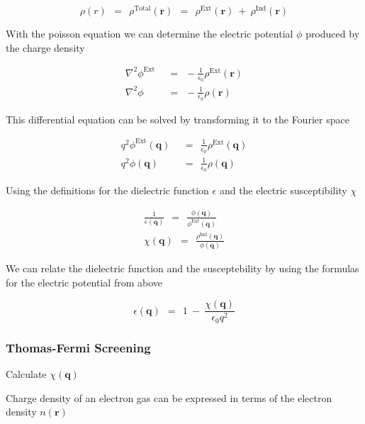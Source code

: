 \documentclass[10pt]{report}
\numberwithin{equation}{chapter}
\begin{document}
\begin{equation} \label{eq:tot_charge_dens}
  \rho(r) ~~=~~ \rho^\text{Total}(\mathbf{r}) ~~=~~ \rho^\text{Ext}(\mathbf{r}) ~+~ \rho^\text{Ind}(\mathbf{r})
\end{equation}


With the poisson equation we can determine the electric potential $\phi$ produced by the charge density

\begin{align}
  \nabla^2 \phi^\text{Ext} ~~& =~~ -\frac{1}{\epsilon_0} \rho^\text{Ext}(\mathbf{r}) \\
  \nabla^2 \phi	~~& =~~ -\frac{1}{\epsilon_0} \rho(\mathbf{r})
\end{align}


This differential equation can be solved by transforming it to the Fourier space

\begin{align}
  q^2 \phi^\text{Ext}(\mathbf{q}) ~~& =~~ \frac{1}{\epsilon_0} \rho^\text{Ext}(\mathbf{q}) \\
  q^2 \phi (\mathbf{q}) ~~&=~~ \frac{1}{\epsilon_0}  \rho(\mathbf{q})
\end{align}


Using the definitions for the dielectric function $\epsilon$ and the electric susceptibility $\chi$

\begin{align}
  \frac{1}{\epsilon(\mathbf{q})} ~~=~~ \frac{\phi(\mathbf{q})}{\phi^\text{Ext}(\mathbf{q})} \\
  \label{eq:screen_suscept}
  \chi(\mathbf{q}) ~~=~~ \frac{\rho^\text{Ind}(\mathbf{q})}{\phi(\mathbf{q})}
\end{align}

We can relate the dielectric function and the susceptebility  by using the formulas for the electric potential from above

\begin{equation}
  \epsilon(\mathbf{q}) ~~=~~ 1 ~-~ \frac{\chi(\mathbf{q})}{\epsilon_0 q^2}
\end{equation}


\subsubsection{Thomas-Fermi Screening}

Calculate $\chi(\mathbf{q})$


Charge density of an electron gas can be expressed in terms of the electron density $n(\mathbf{r})$
\end{document}
